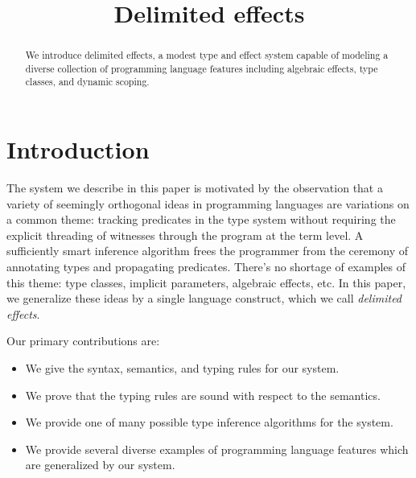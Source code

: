 \documentclass[12pt]{article}
\title{Delimited effects}
\date{}
\begin{document}
  \maketitle

  \begin{abstract}
    We introduce delimited effects, a modest type and effect system capable of modeling a diverse collection of programming language features including algebraic effects, type classes, and dynamic scoping.
  \end{abstract}

  \section{Introduction}

    The system we describe in this paper is motivated by the observation that a variety of seemingly orthogonal ideas in programming languages are variations on a common theme: tracking predicates in the type system without requiring the explicit threading of witnesses through the program at the term level. A sufficiently smart inference algorithm frees the programmer from the ceremony of annotating types and propagating predicates. There's no shortage of examples of this theme: type classes, implicit parameters, algebraic effects, etc. In this paper, we generalize these ideas by a single language construct, which we call \emph{delimited effects}.

    Our primary contributions are:

    \begin{itemize}
      \item We give the syntax, semantics, and typing rules for our system.
      \item We prove that the typing rules are sound with respect to the semantics.
      \item We provide one of many possible type inference algorithms for the system.
      \item We provide several diverse examples of programming language features which are generalized by our system.
    \end{itemize}

    \iffalse
      \begin{lstlisting}[gobble=4]
        effect IO
          getLine   : String ! IO
          printLine : String -> () ! IO
      \end{lstlisting}

      \begin{lstlisting}[gobble=4]
        effect Monoid a
          mempty  : a ! Monoid a
          mappend : a -> a -> a ! Monoid a
      \end{lstlisting}
    \fi
\end{document}
